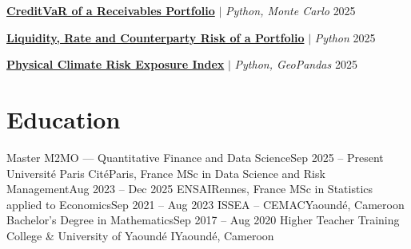   \resumeProjectHeading
    {\href{https://usenamefd.github.io/projects/creditvar-copules.html}{\textbf{CreditVaR of a Receivables Portfolio}} $|$ \emph{Python, Monte Carlo}} {2025}
    \resumeItemListStart
    \resumeItemListEnd

  \resumeProjectHeading
    {\href{https://usenamefd.github.io/projects/risques-asset-management.html}{\textbf{Liquidity, Rate and Counterparty Risk of a Portfolio}} $|$ \emph{Python}} {2025}
    \resumeItemListStart
    \resumeItemListEnd

  \resumeProjectHeading
    {\href{https://usenamefd.github.io/projects/risque-climatique-communes.html}{\textbf{Physical Climate Risk Exposure Index}} $|$ \emph{Python, GeoPandas}} {2025}
    \resumeItemListStart
    \resumeItemListEnd
\resumeSubHeadingListEnd

\section{Education}
\resumeSubHeadingListStart
  \resumeSubheading
    {Master M2MO --- Quantitative Finance and Data Science}{Sep 2025 -- Present}
    {Universit\'e Paris Cit\'e}{Paris, France}
  \vspace{3pt}
  \resumeSubheading
    {MSc in Data Science and Risk Management}{Aug 2023 -- Dec 2025}
    {ENSAI}{Rennes, France}
  \vspace{3pt}
  \resumeSubheading
    {MSc in Statistics applied to Economics}{Sep 2021 -- Aug 2023}
    {ISSEA -- CEMAC}{Yaound\'e, Cameroon}
  \vspace{3pt}
  \resumeSubheading
    {Bachelor's Degree in Mathematics}{Sep 2017 -- Aug 2020}
    {Higher Teacher Training College \& University of Yaound\'e I}{Yaound\'e, Cameroon}
\resumeSubHeadingListEnd


